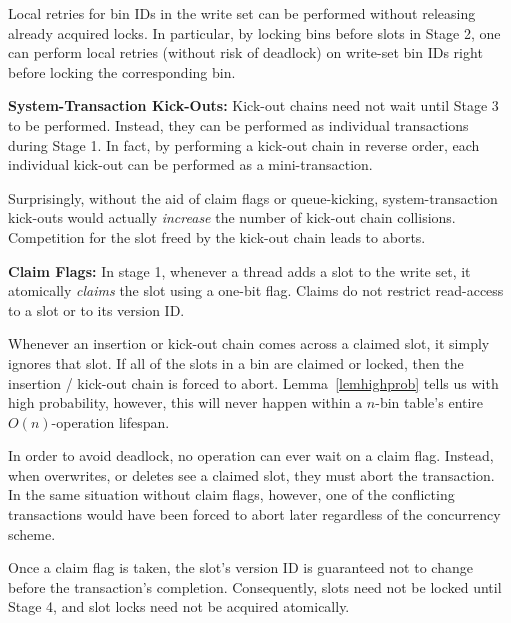 \documentclass{sig-alternate-05-2015}
\begin{document}
Local retries for bin IDs in the write set can be performed without
releasing already acquired locks. In particular, by locking bins
before slots in Stage 2, one can perform local retries (without risk
of deadlock) on write-set bin IDs right before locking the
corresponding bin.




\textbf{System-Transaction Kick-Outs: } Kick-out chains need not wait
until Stage 3 to be performed. Instead, they can be performed as
individual transactions during Stage 1. In fact, by performing a
kick-out chain in reverse order, each individual kick-out can be
performed as a mini-transaction.

Surprisingly, without the aid of claim flags or queue-kicking,
system-transaction kick-outs would actually \emph{increase} the number
of kick-out chain collisions. Competition for the slot freed by the
kick-out chain leads to aborts.

\textbf{Claim Flags: } In stage 1, whenever a thread adds a slot to
the write set, it atomically \emph{claims} the slot using a one-bit
flag. Claims do not restrict read-access to a slot or to its version
ID.

Whenever an insertion or kick-out chain comes across a claimed slot,
it simply ignores that slot. If all of the slots in a bin are claimed
or locked, then the insertion / kick-out chain is forced to
abort. Lemma~\ref{lemhighprob} tells us with high probability,
however, this will never happen within a $n$-bin table's entire
$O(n)$-operation lifespan.

In order to avoid deadlock, no operation can ever wait on a claim
flag. Instead, when overwrites, or deletes see a claimed slot,
they must abort the transaction. In the same situation without claim
flags, however, one of the conflicting transactions would have been
forced to abort later regardless of the concurrency scheme.

Once a claim flag is taken, the slot's version ID is guaranteed not to
change before the transaction's completion. Consequently, slots need
not be locked until Stage 4, and slot locks need not be acquired
atomically. 
\end{document}
